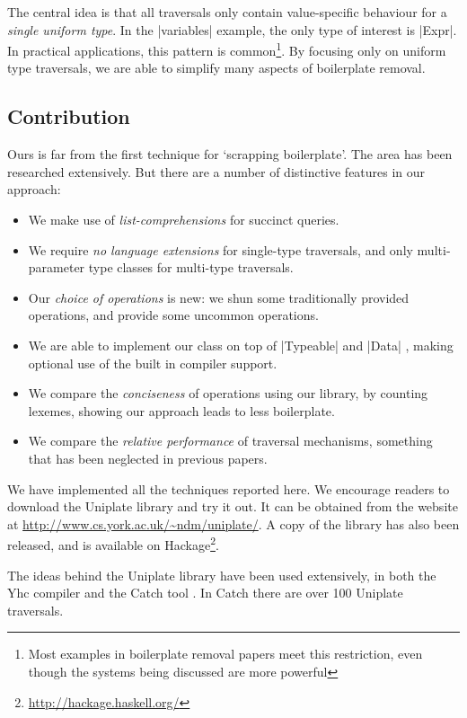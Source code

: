 \documentclass[preprint]{sigplanconf}
\begin{document}
The central idea is that all traversals only contain value-specific behaviour for a \textit{single uniform type}. In the |variables| example, the only type of interest is |Expr|. In practical applications, this pattern is common\footnote{Most examples in boilerplate removal papers meet this restriction, even though the systems being discussed are more powerful}. By focusing only on uniform type traversals, we are able to simplify many aspects of boilerplate removal.

\subsection{Contribution}

Ours is far from the first technique for `scrapping boilerplate'. The area has been researched extensively. But there are a number of distinctive features in our approach:

\begin{itemize}
\item We make use of \textit{list-comprehensions} \citep{wadler:list_comprehensions} for succinct queries.
\item We require \textit{no language extensions} for single-type traversals, and only multi-parameter type classes \citep{jones:mptc} for multi-type traversals.
\item Our \textit{choice of operations} is new: we shun some traditionally provided operations, and provide some uncommon operations.
\item We are able to implement our class on top of |Typeable| and |Data| \citep{lammel:syb}, making optional use of the built in compiler support.
\item We compare the \textit{conciseness} of operations using our library, by counting lexemes, showing our approach leads to less boilerplate.
\item We compare the \textit{relative performance} of traversal mechanisms, something that has been neglected in previous papers.
\end{itemize}

We have implemented all the techniques reported here. We encourage readers to download the Uniplate library and try it out. It can be obtained from the website at \url{http://www.cs.york.ac.uk/~ndm/uniplate/}. A copy of the library has also been released, and is available on Hackage\footnote{\url{http://hackage.haskell.org/}}.

The ideas behind the Uniplate library have been used extensively, in both the Yhc compiler \citep{yhc} and the Catch tool \citep{me:catch_tfp}. In Catch there are over 100 Uniplate traversals.
\end{document}

